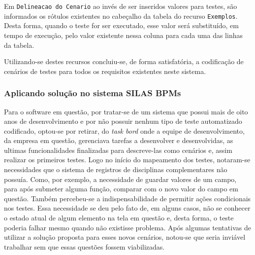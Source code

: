 \documentclass[tg]{mdtufsm}
\begin{document}
Em \texttt{Delineacao do Cenario} ao invés de ser inseridos valores para testes, são informados os rótulos existentes no cabeçalho da tabela do recurso \texttt{Exemplos}. Desta forma, quando o teste for ser executado, esse valor será substituído, em tempo de execução, pelo valor existente nessa coluna para cada uma das linhas da tabela.

Utilizando-se destes recursos concluiu-se, de forma satisfatória, a codificação de cenários de testes para todos os requisitos existentes neste sistema.

\subsubsection{Aplicando solução no sistema SILAS BPMs}
Para o software em questão, por tratar-se de um sistema que possui mais de oito anos de desenvolvimento e por não possuir nenhum tipo de teste automatizado codificado, optou-se por retirar, do \emph{task bord} onde a equipe de desenvolvimento, da empresa em questão, gerenciava tarefas a desenvolver e desenvolvidas, as ultimas funcionalidades finalizadas para descreve-las como cenários e, assim realizar os primeiros testes.
Logo no início do mapeamento dos testes, notaram-se necessidades que o sistema de registros de disciplinas complementares não possuía. Como, por exemplo, a necessidade de guardar valores de um campo, para após submeter alguma função, comparar com o novo valor do campo em questão. Também percebeu-se a indispensabilidade de permitir ações condicionais nos testes. Essa necessidade se deu pelo fato de, em alguns casos, não se conhecer o estado atual de algum elemento na tela em questão e, desta forma, o teste poderia falhar mesmo quando não existisse problema.
Após algumas tentativas de utilizar a solução proposta para esses novos cenários, notou-se que seria inviável trabalhar sem que essas questões fossem viabilizadas.
\end{document}

